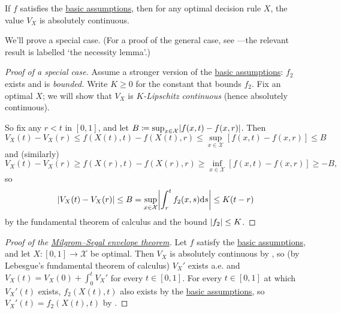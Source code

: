 \begin{lemma}
	\label{lemma:AC}
	If $f$ satisfies the \hyperref[assumption:basic]{basic assumptions},
	then for any optimal decision rule $X$,
	the value $V_X$ is absolutely continuous.
\end{lemma}

We'll prove a special case.
(For a proof of the general case, see \textcite{Sinander2022}---the relevant result is labelled `the necessity lemma'.)

\begin{proof}[Proof of a special case]
	Assume a stronger version of the \hyperref[assumption:basic]{basic assumptions}: $f_2$ exists and is \emph{bounded.}
	Write $K \geq 0$ for the constant that bounds $f_2$.
	Fix an optimal $X$; we will show that $V_X$ is \emph{$K$-Lipschitz continuous} (hence absolutely continuous).

	So fix any $r<t$ in $[0,1]$,
	and let $B \coloneqq \sup_{x \in \mathcal{X}} \abs*{ f(x,t) - f(x,r) }$.
	Then
	\begin{equation*}
		V_X(t) - V_X(r)
		\leq f(X(t),t) - f(X(t),r)
		\leq \sup_{x \in \mathcal{X}}
		[ f(x,t) - f(x,r) ]
		\leq B 
	\end{equation*}
	and (similarly)
	\begin{equation*}
		V_X(t) - V_X(r)
		\geq f(X(r),t) - f(X(r),r)
		\geq \inf_{x \in \mathcal{X}}
		[ f(x,t) - f(x,r) ]
		\geq - B ,
	\end{equation*}
	so
	\begin{equation*}
		\abs*{ V_X(t) - V_X(r) }
		\leq B
		= \sup_{x \in \mathcal{X}}
		\abs*{ \int_r^t f_2(x,s) \dd s }
		\leq K(t-r) 
	\end{equation*}
	by the fundamental theorem of calculus
	and the bound $\abs*{f_2} \leq K$.
\end{proof}


\begin{proof}[Proof of {the \hyperref[theorem:MS_envelope]{Milgrom--Segal envelope theorem}}]
	Let $f$ satisfy the \hyperref[assumption:basic]{basic assumptions}, and let $X : [0,1] \to \mathcal{X}$ be optimal.
	Then $V_X$ is absolutely continuous by ,
	so (by Lebesgue's fundamental theorem of calculus)
	$V_X'$ exists a.e.
	and $V_X(t) = V_X(0) + \int_0^t V_X'$ for every $t \in [0,1]$.
	For every $t \in [0,1]$ at which $V_X'(t)$ exists,
	$f_2(X(t),t)$ also exists by the \hyperref[assumption:basic]{basic assumptions},
	so $V_X'(t) = f_2(X(t),t)$ by .
\end{proof}



